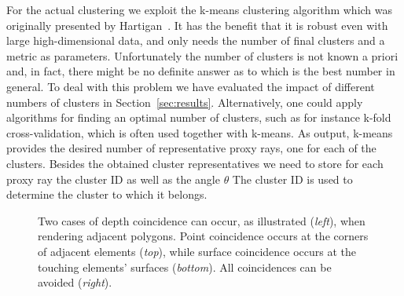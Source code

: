 \documentclass[journal]{vgtc}                %
\begin{document}
For the actual clustering we exploit the k-means clustering algorithm which was originally presented by Hartigan~\cite{hartigan75kmeans}. It has the benefit that it is robust even with large high-dimensional data, and only needs the number of final clusters and a metric as parameters. Unfortunately the number of clusters is not known a priori and, in fact, there might be no definite answer as to which is the best number in general. To deal with this problem we have evaluated the impact of different numbers of clusters in Section~\ref{sec:results}. Alternatively, one could apply algorithms for finding an optimal number of clusters, such as for instance k-fold cross-validation, which is often used together with k-means. As output, k-means provides the desired number of representative proxy rays, one for each of the clusters. Besides the obtained cluster representatives we need to store for each proxy ray the cluster ID as well as the angle $\theta$ The cluster ID is used to determine the cluster to which it belongs.
%
\begin{figure}[b]
  \centering
      \centering 
  \caption{Two cases of depth coincidence can occur, as illustrated ({\it left}), when rendering adjacent polygons. Point coincidence occurs at the corners of adjacent elements ({\it top}), while surface coincidence occurs at the touching elements' surfaces ({\it bottom}). All coincidences can be avoided ({\it right}).}  
  \label{fig:depthcoincidence}
\end{figure}
%
\end{document}
